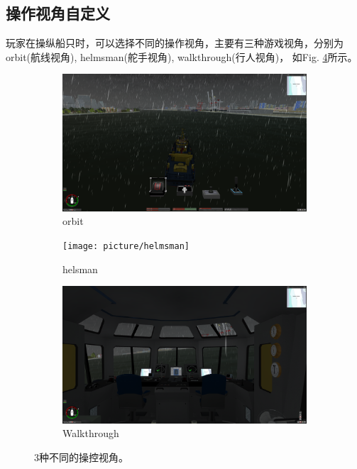 \documentclass[letterpaper,10pt]{article}
\begin{document}
		\subsection{操作视角自定义}
				
		玩家在操纵船只时，可以选择不同的操作视角，主要有三种游戏视角，分别为 orbit(航线视角), helmsman(舵手视角), walkthrough(行人视角)， 如Fig. \ref{fig: View}所示。
				
		\begin{figure}[htbp] 
		\centering 
					
			\begin{subfigure}{0.3\textwidth}
				\includegraphics[width=\linewidth]{picture/orbit}
				\captionsetup{font=scriptsize}
				\caption{orbit}
				\label{fig: orbit}
			\end{subfigure}
			\begin{subfigure}{0.3\textwidth}
				\texttt{[image: picture/helmsman]}
				\captionsetup{font=scriptsize}
				\caption{helsman}
				\label{fig: helmsman}
			\end{subfigure}
			\begin{subfigure}{0.3\textwidth}
				\includegraphics[width=\linewidth]{picture/walkthrough}
				\captionsetup{font=scriptsize}
				\caption{Walkthrough}
				\label{fig: walkthrough}	
			\end{subfigure}
				\captionsetup{font=scriptsize}
				\caption{
				\label{fig: View}						
					3种不同的操控视角。
				}
		\end{figure}
		
\end{document}
